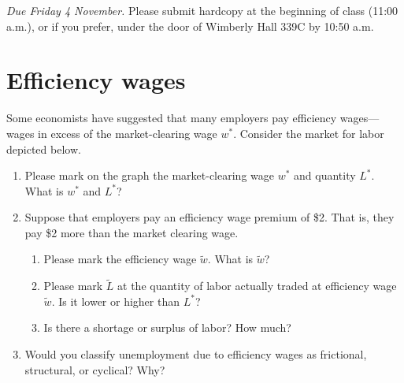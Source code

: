 \documentclass{assignment}
\date{Monday 31 October 2022}
\begin{document}
\RaggedRight

\beginassignment{}

\emph{Due Friday 4 November.} Please submit hardcopy at the beginning of class (11:00 a.m.), or if you prefer, under the door of Wimberly Hall 339C by 10:50 a.m.

\section{Efficiency wages}

Some economists have suggested that many employers pay efficiency wages---wages in excess of the market-clearing wage $w^*$. Consider the market for labor depicted below. 

\begin{center}
\end{center}

\begin{enumerate}
\item Please mark on the graph the market-clearing wage $w^*$ and quantity $L^*$. What is $w^*$ and $L^*$?

\vfill

\clearpage

\item Suppose that employers pay an efficiency wage premium of \$2. That is, they pay \$2 more than the market clearing wage.

\begin{enumerate}

\item Please mark the efficiency wage $\widetilde{w}$. What is $\widetilde{w}$?

\vfill

\item Please mark $\widetilde{L}$ at the quantity of labor actually traded at efficiency wage $\widetilde{w}$. Is it lower or higher than $L^*$?

\vfill

\item Is there a shortage or surplus of labor? How much?

\vfill
\vfill

\end{enumerate}

\item Would you classify unemployment due to efficiency wages as frictional, structural, or cyclical? Why?

\vfill
\vfill

\end{enumerate}
\end{document}
